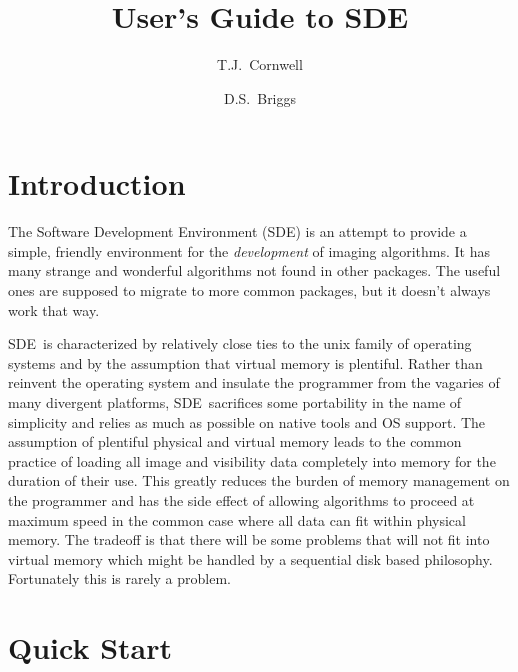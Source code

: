 \pagestyle{headings}
\setlength{\evensidemargin}{.25in}
\setlength{\oddsidemargin}{0.cm}
\setlength{\textwidth}{15.8cm}
\setlength{\topmargin}{0.cm}
\setlength{\textheight}{20cm}
%

\newcommand{\sde}{{\sf SDE}}
\newcommand{\aips}{${\cal AIPS}$}
\def\caret{\char`\^}
\title{User's Guide to \sde}
\author{T.J.~Cornwell
        \and D.S.~Briggs}
\maketitle
\tableofcontents
\cleardoublepage
\section{Introduction}

The Software Development Environment (\sde) is an attempt to provide a
simple, friendly environment for the {\em development} of imaging algorithms.
It has many strange and wonderful algorithms not found in other packages.
The useful ones are supposed to migrate to more common packages, but it
doesn't always work that way.

\sde\ is characterized by relatively close ties to the unix family of
operating systems and by the assumption that virtual memory is plentiful.
Rather than reinvent the operating system and insulate the programmer
from the vagaries of many divergent platforms, \sde\ sacrifices some
portability in the name of simplicity and relies as much as possible
on native tools and OS support.  The assumption of plentiful physical and
virtual memory leads to the common practice of loading all image and
visibility data completely into memory for the duration of their use.
This greatly reduces the burden of memory management on the programmer
and has the side effect of allowing algorithms to proceed at maximum
speed in the common case where all data can fit within physical memory.
The tradeoff is that there will be some problems that will not fit
into virtual memory which might be handled by a sequential disk based
philosophy.  Fortunately this is rarely a problem.

\newpage
\section{Quick Start}

